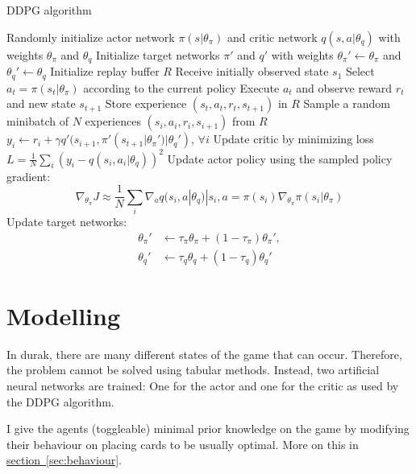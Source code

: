 \documentclass[a4paper,titlepage]{article}
\begin{document}
\begin{algorithm}
  \caption{DDPG algorithm}
  \label{alg:ddpg}
  \begin{algorithmic}
    \State Randomly initialize actor network $\pi(s | \theta_\pi)$ and critic network $q(s, a | \theta_q)$ with weights $\theta_\pi$ and $\theta_q$
    \State Initialize target networks $\pi'$ and $q'$ with weights $\theta_\pi' \gets \theta_\pi$ and $\theta_q' \gets \theta_q$
    \State Initialize replay buffer $R$
      Receive initially observed state $s_1$
        \State Select $a_t = \pi(s_t | \theta_\pi)$ according to the current policy
        \State Execute $a_t$ and observe reward $r_t$ and new state $s_{t+1}$
        \State Store experience $(s_t, a_t, r_t, s_{t+1})$ in $R$
        \State Sample a random minibatch of $N$ experiences $(s_i, a_i, r_i, s_{i+1})$ from $R$
        \State $y_i \gets r_i + \gamma q'(s_{i+1}, \pi'(s_{t+1} | \theta_\pi') | \theta_q')$, $\forall i$
        \State Update critic by minimizing loss $L = \frac{1}{N} \sum_i (y_i - q(s_i, a_i | \theta_q))^2$
        \State Update actor policy using the sampled policy gradient:
        \begin{equation*}
          \nabla_{\theta_\pi} J \approx \frac{1}{N} \sum_i \nabla_a q(s_i, a | \theta_q) | s_i, a = \pi(s_i) \nabla_{\theta_\pi} \pi(s_i | \theta_\pi)
        \end{equation*}
        \State Update target networks:
        \begin{align*}
          \theta_\pi' &\gets \tau_\pi \theta_\pi + (1 - \tau_\pi) \theta_\pi', \\
          \theta_q' &\gets \tau_q \theta_q + (1 - \tau_q) \theta_q'
        \end{align*}
      \EndFor
    \EndFor
  \end{algorithmic}
\end{algorithm}

\newpage

\section{Modelling}

In durak, there are many different states of the game that can occur. Therefore, the problem cannot be solved using tabular methods. Instead, two artificial neural networks are trained: One for the actor and one for the critic as used by the DDPG algorithm.

I give the agents (toggleable) minimal prior knowledge on the game by modifying their behaviour on placing cards to be usually optimal. More on this in \hyperref[sec:behaviour]{section~\ref*{sec:behaviour}}.
\end{document}
